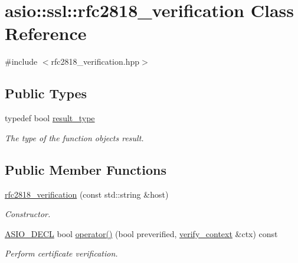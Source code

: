 \hypertarget{classasio_1_1ssl_1_1rfc2818__verification}{}\section{asio\+:\+:ssl\+:\+:rfc2818\+\_\+verification Class Reference}
\label{classasio_1_1ssl_1_1rfc2818__verification}


{\ttfamily \#include $<$rfc2818\+\_\+verification.\+hpp$>$}

\subsection*{Public Types}
\begin{DoxyCompactItemize}
\item 
typedef bool \hyperlink{classasio_1_1ssl_1_1rfc2818__verification_a793767089e5bc88c7c28ed182e9cba02}{result\+\_\+type}
\begin{DoxyCompactList}\small\item\em The type of the function object\textquotesingle{}s result. \end{DoxyCompactList}\end{DoxyCompactItemize}
\subsection*{Public Member Functions}
\begin{DoxyCompactItemize}
\item 
\hyperlink{classasio_1_1ssl_1_1rfc2818__verification_a169b8df5bed1cdf4099bc424b0e99ddd}{rfc2818\+\_\+verification} (const std\+::string \&host)
\begin{DoxyCompactList}\small\item\em Constructor. \end{DoxyCompactList}\item 
\hyperlink{config_8hpp_ab54d01ea04afeb9a8b39cfac467656b7}{A\+S\+I\+O\+\_\+\+D\+E\+C\+L} bool \hyperlink{classasio_1_1ssl_1_1rfc2818__verification_a0ffc96e1ffe4cc3966b31c9f129534f7}{operator()} (bool preverified, \hyperlink{classasio_1_1ssl_1_1verify__context}{verify\+\_\+context} \&ctx) const 
\begin{DoxyCompactList}\small\item\em Perform certificate verification. \end{DoxyCompactList}\end{DoxyCompactItemize}


